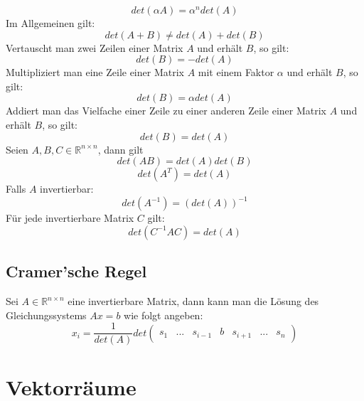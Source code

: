 \documentclass[a4paper,twocolumn,10pt]{article}
\begin{document}
\begin{equation*}
det(\alpha A)=\alpha^n det(A)
\end{equation*}
Im Allgemeinen gilt:
\begin{equation*}
det(A+B)\neq det(A)+det(B)
\end{equation*}
Vertauscht man zwei Zeilen einer Matrix $A$ und erhält $B$, so gilt:
\begin{equation*}
det(B)=-det(A)
\end{equation*}
Multipliziert man eine Zeile einer Matrix $A$ mit einem Faktor $\alpha$ und erhält $B$, so gilt:
\begin{equation*}
det(B)=\alpha det(A)
\end{equation*}
Addiert man das Vielfache einer Zeile zu einer anderen Zeile einer Matrix $A$ und erhält $B$, so gilt:
\begin{equation*}
det(B)=det(A)
\end{equation*}
Seien $A,B,C\in\mathbb{R}^{n\times n}$, dann gilt
\begin{equation*}
det(AB)=det(A)det(B)
\end{equation*}
\begin{equation*}
det(A^T)=det(A)
\end{equation*}
Falls $A$ invertierbar:
\begin{equation*}
det(A^{-1})=(det(A))^{-1}
\end{equation*}
Für jede invertierbare Matrix $C$ gilt:
\begin{equation*}
det(C^{-1}AC)=det(A)
\end{equation*}

\subsection{Cramer'sche Regel}
Sei $A\in \mathbb{R}^{n\times n}$ eine invertierbare Matrix, dann kann man die Lösung des Gleichungssystems $Ax=b$ wie folgt angeben:
\begin{equation*}
x_i=\frac{1}{det(A)}det\begin{pmatrix}s_1 & ... & s_{i-1} & b & s_{i+1} & ... & s_n\end{pmatrix}
\end{equation*}

\section{Vektorräume}
\end{document}
